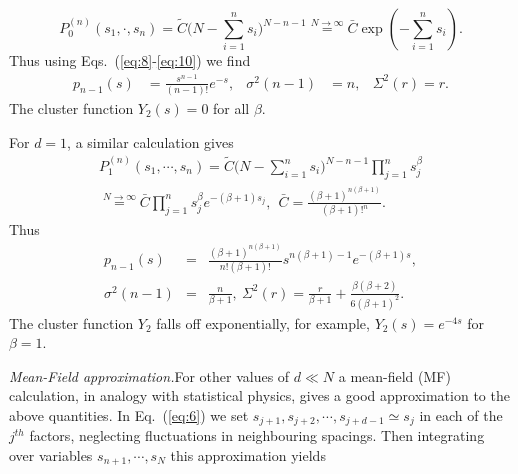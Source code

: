 \documentclass[reprint,amsmath,amssymb,showpacs,aps,]{revtex4-1}
\begin{document}
{%
\begin{equation}\label{eq:11}
P_{0}^{(n)}(s_{1},\cdot,s_{n})= \tilde{C} \Big(N-\sum_{i=1}^{n}s_{i}\Big)^{N-n-1} \overset{N\rightarrow\infty}{=}\bar{C} \exp(-\sum_{i=1}^{n}s_{i}).
\end{equation}
Thus using Eqs.~(\ref{eq:8}-\ref{eq:10}) we find 
\begin{align}\label{eq:12}
p_{n-1}(s)&= \frac{s^{n-1}}{(n-1)!}e^{-s}, & \sigma^{2}(n-1)&=n, & \Sigma^{2}(r)=r.
\end{align}
The cluster function $Y_{2}(s)=0$ for all $\beta$.
\par
For $d=1$, a similar calculation gives
\begin{eqnarray}\label{eq:13}
P_{1}^{(n)}(s_{1},\cdots,s_{n})= \tilde{C} \Big(N-\sum_{i=1}^{n}s_{i}\Big)^{N-n-1}\prod_{j=1}^{n}s_{j}^{\beta}\nonumber \\
\overset{N\rightarrow\infty}{=}\bar{C}\prod_{j=1}^{n}s_{j}^{\beta}e^{-(\beta+1)s_{j}},~~ \bar{C} =\frac{(\beta+1)^{n(\beta+1)}}{(\beta+1)!^{n}}.
\end{eqnarray}
Thus
\begin{eqnarray}\label{eq:14}
p_{n-1}(s)&=& \frac{(\beta+1)^{n(\beta+1)}}{n!(\beta+1)!}s^{n(\beta+1)-1}e^{-(\beta+1)s},\nonumber \\
  \sigma^{2}(n-1)&=&\frac{n}{\beta+1},~\Sigma^{2}(r)=\frac{r}{\beta+1}+\frac{\beta(\beta+2)}{6(\beta+1)^{2}}.
\end{eqnarray}
The cluster function $Y_{2}$ falls off exponentially, for example, $Y_{2}(s)= e^{-4s}$ for $\beta=1$.
\par
\textit{Mean-Field approximation.}\textemdash For other values of $d \ll N$  a mean-field (MF) calculation, in analogy with statistical physics, gives a good approximation to the above quantities. In Eq.~(\ref{eq:6}) we set $s_{j+1},s_{j+2},\cdots, s_{j+d-1}\simeq s_{j}$ in each of the $j^{th}$ factors, neglecting fluctuations in neighbouring spacings. Then integrating over variables $s_{n+1},\cdots,s_{N}$ this approximation yields
}
\end{document}
